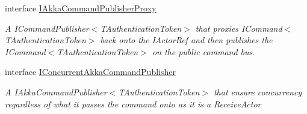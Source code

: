 \begin{DoxyCompactItemize}
interface \hyperlink{interfaceCqrs_1_1Akka_1_1Commands_1_1IAkkaCommandPublisherProxy}{I\+Akka\+Command\+Publisher\+Proxy}
\begin{DoxyCompactList}\small\item\em A I\+Command\+Publisher$<$\+T\+Authentication\+Token$>$ that proxies I\+Command$<$\+T\+Authentication\+Token$>$ back onto the I\+Actor\+Ref and then publishes the I\+Command$<$\+T\+Authentication\+Token$>$ on the public command bus. \end{DoxyCompactList}\item 
interface \hyperlink{interfaceCqrs_1_1Akka_1_1Commands_1_1IConcurrentAkkaCommandPublisher}{I\+Concurrent\+Akka\+Command\+Publisher}
\begin{DoxyCompactList}\small\item\em A I\+Akka\+Command\+Publisher$<$\+T\+Authentication\+Token$>$ that ensure concurrency regardless of what it passes the command onto as it is a Receive\+Actor \end{DoxyCompactList}\end{DoxyCompactItemize}
